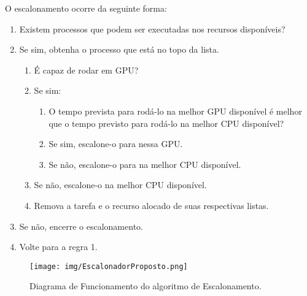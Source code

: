 O escalonamento ocorre da seguinte forma:
\begin{enumerate}
	\item Existem processos que podem ser executadas nos recursos disponíveis?
	\item Se sim, obtenha o processo que está no topo da lista.
	\begin{enumerate}
		\item É capaz de rodar em GPU?
		\item Se sim:
		\begin{enumerate}
			\item O tempo prevista para rodá-lo na melhor \acrshort{GPU} disponível é melhor que o tempo previsto para rodá-lo na melhor \acrshort{CPU} disponível?
			\item Se sim, escalone-o para nessa \acrshort{GPU}.
			\item Se não, escalone-o para na melhor \acrshort{CPU} disponível.
		\end{enumerate}
		\item Se não, escalone-o na melhor \acrshort{CPU} disponível.
		\item Remova a tarefa e o recurso alocado de suas respectivas listas.
	\end{enumerate}
	\item Se não, encerre o escalonamento.
	\item Volte para a regra 1.
\end{enumerate}

\begin{figure}[htbp]
	\centerline{\texttt{[image: img/EscalonadorProposto.png]}}
	\caption{Diagrama de Funcionamento do algoritmo de Escalonamento.}
	\label{Escalonamento}
\end{figure}
